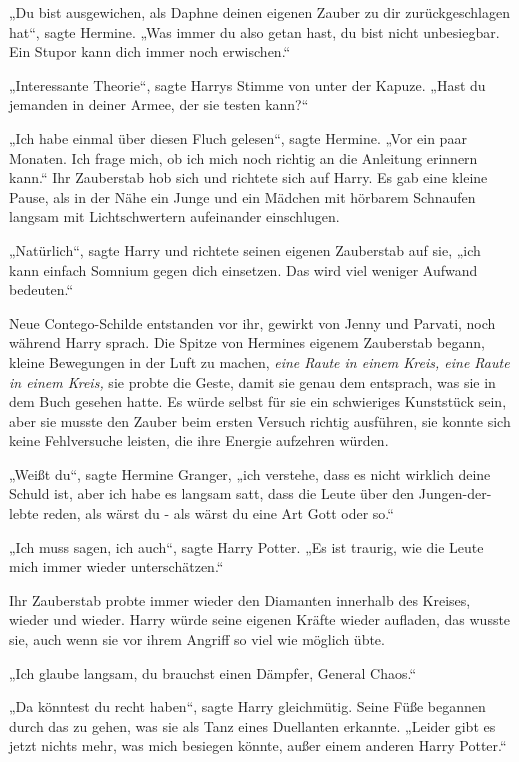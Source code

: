 {„Du bist ausgewichen, als Daphne deinen eigenen Zauber zu dir zurückgeschlagen hat“, sagte Hermine. „Was immer du also getan hast, du bist nicht unbesiegbar. Ein Stupor kann dich immer noch erwischen.“

„Interessante Theorie“, sagte Harrys Stimme von unter der Kapuze. „Hast du jemanden in deiner Armee, der sie testen kann?“

„Ich habe einmal über diesen Fluch gelesen“, sagte Hermine. „Vor ein paar Monaten. Ich frage mich, ob ich mich noch richtig an die Anleitung erinnern kann.“ Ihr Zauberstab hob sich und richtete sich auf Harry. Es gab eine kleine Pause, als in der Nähe ein Junge und ein Mädchen mit hörbarem Schnaufen langsam mit Lichtschwertern aufeinander einschlugen.

„Natürlich“, sagte Harry und richtete seinen eigenen Zauberstab auf sie, „ich kann einfach Somnium gegen dich einsetzen. Das wird viel weniger Aufwand bedeuten.“

Neue Contego-Schilde entstanden vor ihr, gewirkt von Jenny und Parvati, noch während Harry sprach. Die Spitze von Hermines eigenem Zauberstab begann, kleine Bewegungen in der Luft zu machen, \emph{eine Raute in einem Kreis, eine Raute in einem Kreis,} sie probte die Geste, damit sie genau dem entsprach, was sie in dem Buch gesehen hatte. Es würde selbst für sie ein schwieriges Kunststück sein, aber sie musste den Zauber beim ersten Versuch richtig ausführen, sie konnte sich keine Fehlversuche leisten, die ihre Energie aufzehren würden.

„Weißt du“, sagte Hermine Granger, „ich verstehe, dass es nicht wirklich deine Schuld ist, aber ich habe es langsam satt, dass die Leute über den Jungen-der-lebte reden, als wärst du - als wärst du eine Art Gott oder so.“

„Ich muss sagen, ich auch“, sagte Harry Potter. „Es ist traurig, wie die Leute mich immer wieder unterschätzen.“

Ihr Zauberstab probte immer wieder den Diamanten innerhalb des Kreises, wieder und wieder. Harry würde seine eigenen Kräfte wieder aufladen, das wusste sie, auch wenn sie vor ihrem Angriff so viel wie möglich übte.

„Ich glaube langsam, du brauchst einen Dämpfer, General Chaos.“

„Da könntest du recht haben“, sagte Harry gleichmütig. Seine Füße begannen durch das zu gehen, was sie als Tanz eines Duellanten erkannte. „Leider gibt es jetzt nichts mehr, was mich besiegen könnte, außer einem anderen Harry Potter.“

}

